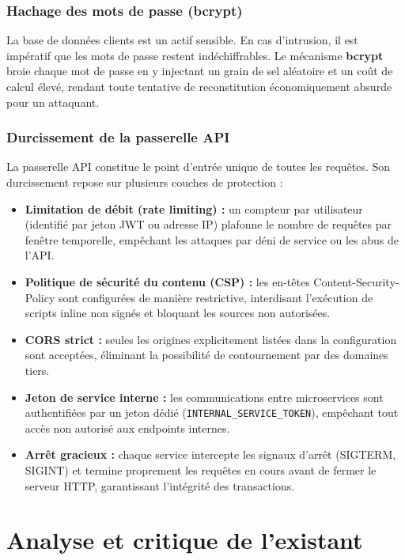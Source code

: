 \subsubsection{Hachage des mots de passe (bcrypt)}

La base de données clients est un actif sensible. En cas d'intrusion, il est impératif que les mots de passe restent indéchiffrables. Le mécanisme \textbf{bcrypt} broie chaque mot de passe en y injectant un grain de sel aléatoire et un coût de calcul élevé, rendant toute tentative de reconstitution économiquement absurde pour un attaquant.

\subsubsection{Durcissement de la passerelle API}

La passerelle API constitue le point d'entrée unique de toutes les requêtes. Son durcissement repose sur plusieurs couches de protection :

\begin{itemize}
    \item \textbf{Limitation de débit (rate limiting) :} un compteur par utilisateur (identifié par jeton JWT ou adresse IP) plafonne le nombre de requêtes par fenêtre temporelle, empêchant les attaques par déni de service ou les abus de l'API.
    \item \textbf{Politique de sécurité du contenu (CSP) :} les en-têtes Content-Security-Policy sont configurées de manière restrictive, interdisant l'exécution de scripts inline non signés et bloquant les sources non autorisées.
    \item \textbf{CORS strict :} seules les origines explicitement listées dans la configuration sont acceptées, éliminant la possibilité de contournement par des domaines tiers.
    \item \textbf{Jeton de service interne :} les communications entre microservices sont authentifiées par un jeton dédié (\texttt{INTERNAL\_SERVICE\_TOKEN}), empêchant tout accès non autorisé aux endpoints internes.
    \item \textbf{Arrêt gracieux :} chaque service intercepte les signaux d'arrêt (SIGTERM, SIGINT) et termine proprement les requêtes en cours avant de fermer le serveur HTTP, garantissant l'intégrité des transactions.
\end{itemize}

\section{Analyse et critique de l'existant}

